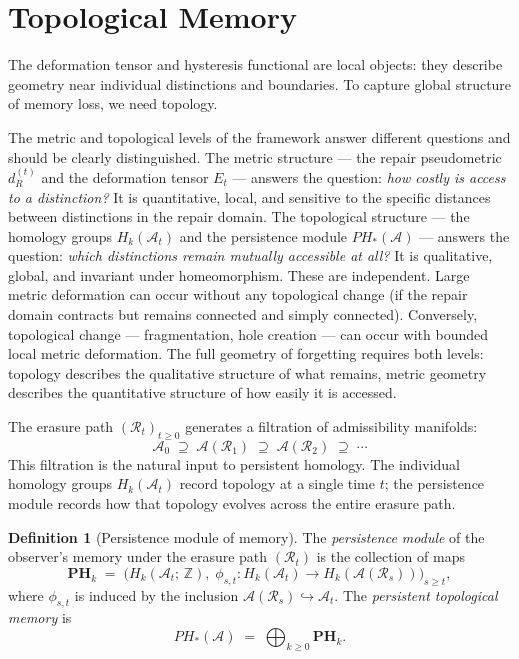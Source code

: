 \documentclass[12pt, oneside]{article}
\theoremstyle{plain}
\theoremstyle{definition}
\newtheorem{definition}[theorem]{Definition}
\theoremstyle{remark}
\newcommand{\AO}{\mathcal{A}}
\newcommand{\At}{\mathcal{A}_t}
\newcommand{\Azero}{\mathcal{A}_0}
\newcommand{\Rt}{\mathcal{R}_t}
\newcommand{\Et}{E_t}
\newcommand{\dRt}{d_R^{(t)}}
\begin{document}
\section{Topological Memory}
\label{sec:topology}

The deformation tensor and hysteresis functional are local objects:
they describe geometry near individual distinctions and boundaries.
To capture global structure of memory loss, we need topology.

The metric and topological levels of the framework answer different
questions and should be clearly distinguished.
The metric structure --- the repair pseudometric $\dRt$ and the
deformation tensor $\Et$ --- answers the question: \emph{how costly
is access to a distinction?}
It is quantitative, local, and sensitive to the specific distances
between distinctions in the repair domain.
The topological structure --- the homology groups $H_k(\At)$ and
the persistence module $PH_*(\AO)$ --- answers the question:
\emph{which distinctions remain mutually accessible at all?}
It is qualitative, global, and invariant under homeomorphism.
These are independent.
Large metric deformation can occur without any topological change
(if the repair domain contracts but remains connected and simply
connected).
Conversely, topological change --- fragmentation, hole creation ---
can occur with bounded local metric deformation.
The full geometry of forgetting requires both levels: topology
describes the qualitative structure of what remains, metric geometry
describes the quantitative structure of how easily it is accessed.

The erasure path $(\Rt)_{t \geq 0}$ generates a filtration of
admissibility manifolds:
\[
  \Azero \;\supseteq\; \AO(\mathcal{R}_1) \;\supseteq\; \AO(\mathcal{R}_2)
  \;\supseteq\; \cdots
\]
This filtration is the natural input to persistent homology.
The individual homology groups $H_k(\At)$ record topology at a
single time $t$; the persistence module records how that topology
evolves across the entire erasure path.

\begin{definition}[Persistence module of memory]
  The \emph{persistence module} of the observer's memory under the
  erasure path $(\Rt)$ is the collection of maps
  \[
    \mathbf{PH}_k
    \;=\;
    \bigl(H_k(\At;\, \mathbb{Z}),\;
    \phi_{s,t} : H_k(\At) \to H_k(\AO(\mathcal{R}_s))\bigr)_{s \geq t},
  \]
  where $\phi_{s,t}$ is induced by the inclusion $\AO(\mathcal{R}_s)
  \hookrightarrow \At$.
  The \emph{persistent topological memory} is
  \[
    PH_*(\AO)
    \;=\;
    \bigoplus_{k \geq 0} \mathbf{PH}_k.
  \]
\end{definition}
\end{document}
